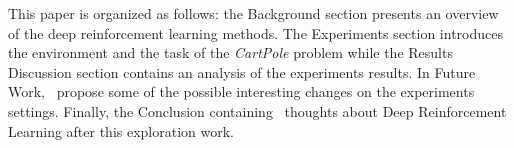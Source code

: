 This paper is organized as follows: the Background section presents an overview of the deep reinforcement learning methods. The Experiments section introduces the environment and the task of the \textit{CartPole} problem while the Results Discussion section contains an analysis of the experiments results. In Future Work, \auth~propose some of the possible interesting changes on the experiments settings. Finally, the Conclusion containing \authpp~thoughts about Deep Reinforcement Learning after this exploration work.

